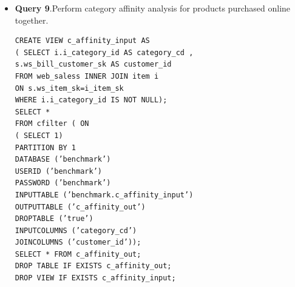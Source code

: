 \documentclass[12pt]{book}
\begin{document}
\begin{itemize}
\item \textbf{Query 9}.Perform category affinity analysis for products purchased online together.
\begin{lstlisting}[frame=single]
CREATE VIEW c_affinity_input AS
( SELECT i.i_category_id AS category_cd ,
s.ws_bill_customer_sk AS customer_id
FROM web_saless INNER JOIN item i
ON s.ws_item_sk=i_item_sk
WHERE i.i_category_id IS NOT NULL);
SELECT *
FROM cfilter ( ON
( SELECT 1)
PARTITION BY 1
DATABASE (’benchmark’)
USERID (’benchmark’)
PASSWORD (’benchmark’)
INPUTTABLE (’benchmark.c_affinity_input’)
OUTPUTTABLE (’c_affinity_out’)
DROPTABLE (’true’)
INPUTCOLUMNS (’category_cd’)
JOINCOLUMNS (’customer_id’));
SELECT * FROM c_affinity_out;
DROP TABLE IF EXISTS c_affinity_out;
DROP VIEW IF EXISTS c_affinity_input;
\end{lstlisting}
\end{itemize}
\end{document}
